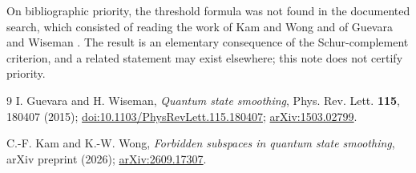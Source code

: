 \documentclass[11pt,a4paper]{article}
\theoremstyle{definition}
\theoremstyle{plain}
\begin{document}
On bibliographic priority, the threshold formula was not found in the
documented search, which consisted of reading the work of Kam and Wong
\cite{KamWong2026} and of Guevara and Wiseman \cite{Guevara2015}. The result is
an elementary consequence of the Schur-complement criterion, and a related
statement may exist elsewhere; this note does not certify priority.

\begin{thebibliography}{9}
\setlength{\itemsep}{2pt}
I. Guevara and H. Wiseman,
\emph{Quantum state smoothing},
Phys. Rev. Lett. \textbf{115}, 180407 (2015);
\href{https://doi.org/10.1103/PhysRevLett.115.180407}{doi:10.1103/PhysRevLett.115.180407};
\href{https://arxiv.org/abs/1503.02799}{arXiv:1503.02799}.

C.-F. Kam and K.-W. Wong,
\emph{Forbidden subspaces in quantum state smoothing},
arXiv preprint (2026);
\href{https://arxiv.org/abs/2609.17307}{arXiv:2609.17307}.
\end{thebibliography}
\end{document}
